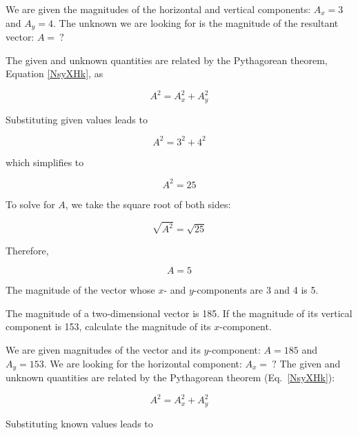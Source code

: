 \documentclass[dvipsnames]{article}
\numberwithin{equation}{section}
\numberwithin{figure}{section}
\begin{document}
\Solution We are given the magnitudes of the horizontal and vertical components: $A_x = 3$ and $A_y = 4$. The unknown we are looking for is the magnitude of the resultant vector: $A =\ ?$

\vspace{1em}

The given and unknown quantities are related by the Pythagorean theorem, Equation \eqref{NsyXHk}, as

\begin{equation*}
    A^2 = A_x^2 + A_y^2
\end{equation*}

Substituting given values leads to 

\begin{equation*}
    A^2 = 3^2 + 4^2
\end{equation*}

which simplifies to

\begin{equation*}
    A^2 = 25
\end{equation*}

To solve for $A$, we take the square root of both sides:

\begin{equation*}
    \sqrt{A^2} = \sqrt{25}
\end{equation*}

Therefore, 

\begin{equation*}
    A = 5
\end{equation*}

The magnitude of the vector whose $x$- and $y$-components are 3 and 4 is 5. 

\solutionEnd

\begin{example}
    The magnitude of a two-dimensional vector is 185. If the magnitude of its vertical component is 153, calculate the magnitude of its $x$-component. 
\end{example}

\Solution We are given magnitudes of the vector and its $y$-component: $A = 185$ and $A_y = 153$. We are looking for the horizontal component: $A_x =\ ?$ The given and unknown quantities are related by the Pythagorean theorem (Eq.~\ref{NsyXHk}):

\begin{equation*}
    A^2 = A_x^2 + A_y^2
\end{equation*}

Substituting known values leads to 
\end{document}
